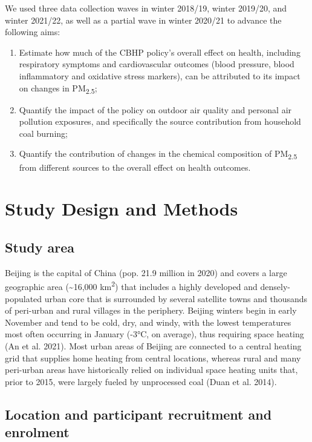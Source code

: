 \documentclass[
  letterpaper,
  DIV=11,
  numbers=noendperiod]{scrartcl}
\begin{document}
We used three data collection waves in winter 2018/19, winter 2019/20,
and winter 2021/22, as well as a partial wave in winter 2020/21 to
advance the following aims:

\begin{enumerate}
\def\labelenumi{\arabic{enumi}.}
\item
  Estimate how much of the CBHP policy's overall effect on health,
  including respiratory symptoms and cardiovascular outcomes (blood
  pressure, blood inflammatory and oxidative stress markers), can be
  attributed to its impact on changes in PM\textsubscript{2.5};
\item
  Quantify the impact of the policy on outdoor air quality and personal
  air pollution exposures, and specifically the source contribution from
  household coal burning;
\item
  Quantify the contribution of changes in the chemical composition of
  PM\textsubscript{2.5} from different sources to the overall effect on
  health outcomes.
\end{enumerate}

\section{Study Design and Methods}\label{study-design-and-methods}

\subsection{Study area}\label{study-area}

Beijing is the capital of China (pop. 21.9 million in 2020) and covers a
large geographic area (\textasciitilde16,000 km\textsuperscript{2}) that
includes a highly developed and densely-populated urban core that is
surrounded by several satellite towns and thousands of peri-urban and
rural villages in the periphery. Beijing winters begin in early November
and tend to be cold, dry, and windy, with the lowest temperatures most
often occurring in January (-3°C, on average), thus requiring space
heating (An et al. 2021). Most urban areas of Beijing are connected to a
central heating grid that supplies home heating from central locations,
whereas rural and many peri-urban areas have historically relied on
individual space heating units that, prior to 2015, were largely fueled
by unprocessed coal (Duan et al. 2014).

\subsection{Location and participant recruitment and
enrolment}\label{location-and-participant-recruitment-and-enrolment}
\end{document}
